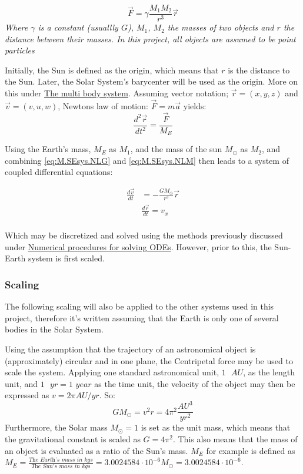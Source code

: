 \documentclass[%
oneside,                 %
final,                   %
10pt]{article}
\begin{document}
\begin{equation}
\vec{F}=\gamma \frac{M_1 M_2}{r^3}\vec{r}
\label{eq:M.SEsys.NLG}
\end{equation} 
\textit{Where $\gamma$ is a constant (usuallly $G$), $M_1$, $M_2$  the masses of two objects and $r$ the distance between their masses. In this project, all objects are assumed to be point particles} \newline


Initially, the Sun is defined as the origin, which means that $r$ is the distance to the Sun. Later, the Solar System's barycenter will be used as the origin. More on this under \hyperref[sec:Modmultibody]{The multi body system}. Assuming vector notation; $\vec{r}=(x,y,z)$ and $\vec{v}=(v,u,w)$,  Newtons law of motion: $\vec{F}=m\vec{a}$ yields: \newline
\begin{equation}
\frac{d^2 \vec{r}}{dt^2}=\frac{\vec{F}}{M_E}
\label{eq:M.SEsys.NLM}
\end{equation}

Using the Earth's mass, $M_E$ as $M_1$, and the mass of the sun $M_{\odot}$ as $M_2$, and combining \eqref{eq:M.SEsys.NLG} and \eqref{eq:M.SEsys.NLM} then leads to a system of coupled differential equations:


\begin{align}
\frac{d\vec{v} }{dt}&=-\frac{GM_{\odot}}{r^3} \vec{r} \label{eq:M.SEsys.dv/dt} \\
&\frac{d\vec{r}}{dt}=v_x \label{eq:M.SEsys.dr/dt}\\
\end{align}

Which may be discretized and solved using the methods previously discussed under \hyperref[sec:NPs]{Numerical procedures for solving ODEs}. However, prior to this, the Sun-Earth system is first scaled. 

\subsubsection{Scaling}
The following scaling will also be applied to the other systems used in this project, therefore it's written assuming that the Earth is only one of several bodies in the Solar System.\newline

Using the assumption that the trajectory of an astronomical object is (approximately) circular and in one plane, the Centripetal force may be used to scale the system. Applying one standard astronomical unit, $1 \text{ } AU$, as the length unit, and $1 \text{ } yr=1 \textit{ year}$ as the time unit, the velocity of the object may then be expressed as $v=2\pi AU/yr$. So:
\begin{equation}
GM_{\odot}=v^2r=4\pi^2  \frac{AU^3}{yr^2} 
\end{equation}
Furthermore, the Solar mass $M_{\odot}=1$ is set as the unit mass, which means that the gravitational constant is scaled as $G=4\pi^2$. This also means that the mass of an object is evaluated as a ratio of the Sun's mass. $M_E$ for example is defined as $M_E=\frac{\textit{The Earth's mass in kgs}}{\textit{The Sun's mass in kgs}}=3.0024584 \cdot  10^{-6} M_{\odot}=3.0024584 \cdot  10^{-6}$. 
\end{document}
